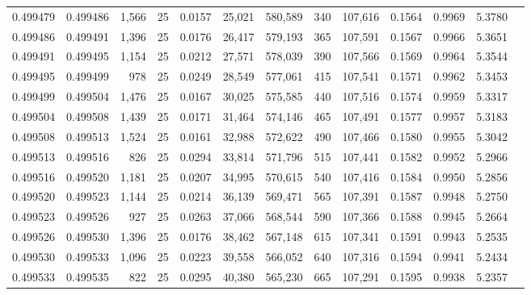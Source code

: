 \begin{tabular}{rrrrrrrrrrrrr}
0.499479 & 0.499486 & 1,566 &  25 &                                     0.0157 &  25,021 & 580,589 &     340 & 107,616 & 0.1564 & 0.9969 & 5.3780 \\
0.499486 & 0.499491 & 1,396 &  25 &                                     0.0176 &  26,417 & 579,193 &     365 & 107,591 & 0.1567 & 0.9966 & 5.3651 \\
0.499491 & 0.499495 & 1,154 &  25 &                                     0.0212 &  27,571 & 578,039 &     390 & 107,566 & 0.1569 & 0.9964 & 5.3544 \\
0.499495 & 0.499499 &   978 &  25 &                                     0.0249 &  28,549 & 577,061 &     415 & 107,541 & 0.1571 & 0.9962 & 5.3453 \\
0.499499 & 0.499504 & 1,476 &  25 &                                     0.0167 &  30,025 & 575,585 &     440 & 107,516 & 0.1574 & 0.9959 & 5.3317 \\
0.499504 & 0.499508 & 1,439 &  25 &                                     0.0171 &  31,464 & 574,146 &     465 & 107,491 & 0.1577 & 0.9957 & 5.3183 \\
0.499508 & 0.499513 & 1,524 &  25 &                                     0.0161 &  32,988 & 572,622 &     490 & 107,466 & 0.1580 & 0.9955 & 5.3042 \\
0.499513 & 0.499516 &   826 &  25 &                                     0.0294 &  33,814 & 571,796 &     515 & 107,441 & 0.1582 & 0.9952 & 5.2966 \\
0.499516 & 0.499520 & 1,181 &  25 &                                     0.0207 &  34,995 & 570,615 &     540 & 107,416 & 0.1584 & 0.9950 & 5.2856 \\
0.499520 & 0.499523 & 1,144 &  25 &                                     0.0214 &  36,139 & 569,471 &     565 & 107,391 & 0.1587 & 0.9948 & 5.2750 \\
0.499523 & 0.499526 &   927 &  25 &                                     0.0263 &  37,066 & 568,544 &     590 & 107,366 & 0.1588 & 0.9945 & 5.2664 \\
0.499526 & 0.499530 & 1,396 &  25 &                                     0.0176 &  38,462 & 567,148 &     615 & 107,341 & 0.1591 & 0.9943 & 5.2535 \\
0.499530 & 0.499533 & 1,096 &  25 &                                     0.0223 &  39,558 & 566,052 &     640 & 107,316 & 0.1594 & 0.9941 & 5.2434 \\
0.499533 & 0.499535 &   822 &  25 &                                     0.0295 &  40,380 & 565,230 &     665 & 107,291 & 0.1595 & 0.9938 & 5.2357 \\

\end{tabular}
